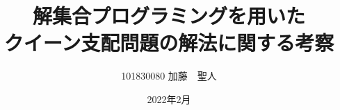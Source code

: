 \documentclass[a4paper,12pt]{jbook}
\title{解集合プログラミングを用いた\\クイーン支配問題の解法に関する考察}
\date{2022年2月}
\author{101830080 \qquad 加藤　聖人}
\begin{document}
\maketitle

\tableofcontents    %
\listoffigures      %
\listoftables       %
\lstlistoflistings  %










\end{document}
